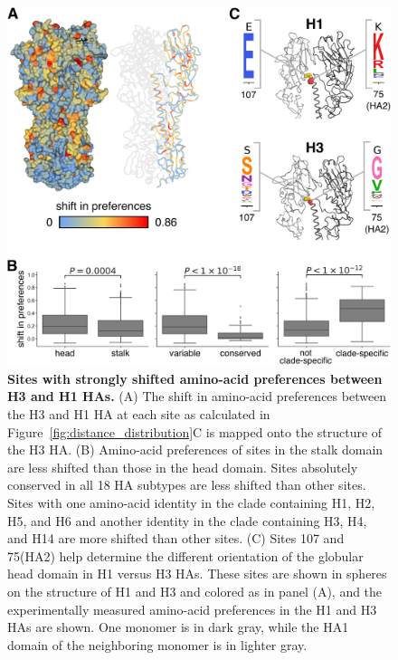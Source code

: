 \documentclass[9pt,twocolumn,twoside]{pnas-new}
\begin{document}
\begin{figure}
\centering
\includegraphics[width=\columnwidth]{figs/RMSD_heatmap/RMSD_heatmap.pdf}
\caption{\label{fig:RMSD_heatmap}
{\bf Sites with strongly shifted amino-acid preferences between H3 and H1 HAs.}
(A) The shift in amino-acid preferences between the H3 and H1 HA at each site as calculated in Figure~\ref{fig:distance_distribution}C is mapped onto the structure of the H3 HA.
(B) Amino-acid preferences of sites in the stalk domain are less shifted than those in the head domain.
Sites absolutely conserved in all 18 HA subtypes are less shifted than other sites.
Sites with one amino-acid identity in the clade containing H1, H2, H5, and H6 and another identity in the clade containing H3, H4, and H14 are more shifted than other sites.
(C) Sites 107 and 75(HA2) help determine the different orientation of the globular head domain in H1 versus H3 HAs.
These sites are shown in spheres on the structure of H1 and H3 and colored as in panel (A), and the experimentally measured amino-acid preferences in the H1 and H3 HAs are shown.
One monomer is in dark gray, while the HA1 domain of the neighboring monomer is in lighter gray.
}
\end{figure}
\end{document}
